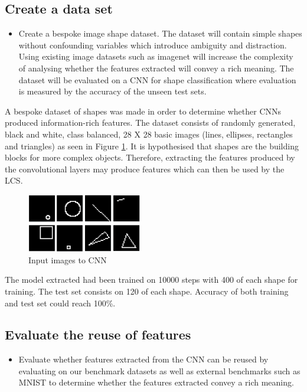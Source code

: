 \subsection{Create a data set}
\begin{itemize}
	\item Create a bespoke image shape dataset. The dataset will contain simple shapes without confounding variables which introduce ambiguity and distraction. Using existing image datasets such as imagenet \cite{imagenet} will increase the complexity of analysing whether the features extracted will convey a rich meaning. The dataset will be evaluated on a CNN for shape classification where evaluation is measured by the accuracy of the unseen test sets.
	
\end{itemize}
A bespoke dataset of shapes was made in order to determine whether CNNs produced information-rich features. The dataset consists of randomly generated, black and white, class balanced, 28 X 28 basic images (lines, ellipses, rectangles and triangles) as seen in Figure \ref{fig:inputShapes}. It is hypothesised that shapes are the building blocks for more complex objects. Therefore, extracting the features produced by the convolutional layers may produce features which can then be used by the LCS. 
\begin{figure}[H]
	\begin{center}
		\includegraphics[width=50mm, scale=0.9]{inputShapes.png}
		\caption{Input images to CNN}
		\label{fig:inputShapes}
	\end{center}
	
\end{figure}
The model extracted had been trained on 10000 steps with 400 of each shape for training. The test set consists on 120 of each shape. Accuracy of both training and test set could reach 100\%. 

\subsection{Evaluate the reuse of features} \label{subsec:reuse}
\begin{itemize}
		\item Evaluate whether features extracted from the CNN can be reused by evaluating on our benchmark datasets as well as external benchmarks such as MNIST to determine whether the features extracted convey a rich meaning.
	
\end{itemize}

